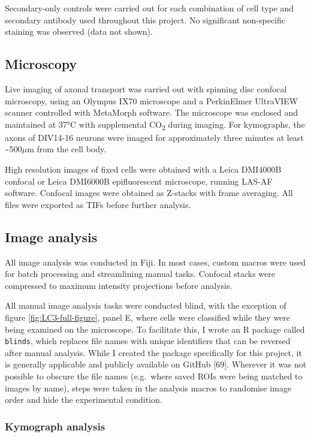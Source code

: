 \documentclass[
  12pt,
  a4paper,
]{book}
\begin{document}
Secondary-only controls were carried out for each combination of cell type and secondary antibody used throughout this project. No significant non-specific staining was observed (data not shown).

\hypertarget{microscopy}{%
\subsection{Microscopy}\label{microscopy}}

Live imaging of axonal transport was carried out with spinning disc confocal microscopy, using an Olympus IX70 microscope and a PerkinElmer UltraVIEW scanner controlled with MetaMorph software. The microscope was enclosed and maintained at 37°C with supplemental CO\textsubscript{2} during imaging. For kymographs, the axons of DIV14-16 neurons were imaged for approximately three minutes at least \textasciitilde500\(\mu\)m from the cell body.

High resolution images of fixed cells were obtained with a Leica DMI4000B confocal or Leica DMI6000B epifluorescent microscope, running LAS-AF software. Confocal images were obtained as Z-stacks with frame averaging. All files were exported as TIFs before further analysis.

\hypertarget{image-analysis}{%
\subsection{Image analysis}\label{image-analysis}}

All image analysis was conducted in Fiji. In most cases, custom macros were used for batch processing and streamlining manual tasks. Confocal stacks were compressed to maximum intensity projections before analysis.

All manual image analysis tasks were conducted blind, with the exception of figure \ref{fig:LC3-full-figure}, panel E, where cells were classified while they were being examined on the microscope. To facilitate this, I wrote an R package called \texttt{blinds}, which replaces file names with unique identifiers that can be reversed after manual analysis. While I created the package specifically for this project, it is generally applicable and publicly available on GitHub {[}69{]}. Wherever it was not possible to obscure the file names (e.g.~where saved ROIs were being matched to images by name), steps were taken in the analysis macros to randomise image order and hide the experimental condition.

\hypertarget{kymo}{%
\subsubsection{Kymograph analysis}\label{kymo}}
\end{document}
